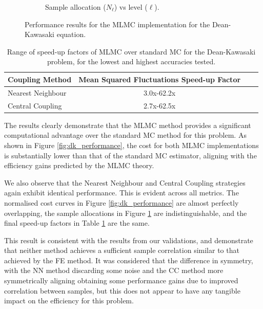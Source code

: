 \begin{figure}[htbp]
\begin{subfigure}{0.45\textwidth}
        \caption{Sample allocation ($N_\ell$) vs level ($\ell$).}
        \label{fig:dk_num}
    \end{subfigure}
    \caption{Performance results for the MLMC implementation for the Dean-Kawasaki equation.}
    \label{fig:performance_results_dk}
\end{figure}


\begin{table}[htbp]
    \centering
    \begin{tabular}{|l|c|c|r|}
        \hline
        \textbf{Coupling Method} & \textbf{Mean Squared Fluctuations Speed-up Factor}\\
        \hline
        Nearest Neighbour & 3.0x-62.2x \\
        Central Coupling & 2.7x-62.5x \\
        \hline
    \end{tabular}
    \caption{Range of speed-up factors of MLMC over standard MC for the Dean-Kawasaki problem, for the 
    lowest and highest accuracies tested.}
    \label{tab:dk_cost_scalings}
\end{table}


The results clearly demonstrate that the MLMC method provides a significant 
computational advantage over the standard MC method for this problem. 
As shown in Figure \ref{fig:dk_performance}, the cost for both MLMC
implementations is substantially lower
than that of the standard MC estimator, aligning with the efficiency 
gains predicted by the MLMC theory.

We also observe that the Nearest Neighbour and Central Coupling strategies again 
exhibit 
identical performance. This is evident across all metrics. The normalised 
cost curves in Figure \ref{fig:dk_performance} are almost perfectly overlapping, 
the sample allocations in Figure \ref{fig:dk_num} are indistinguishable, 
and the final speed-up factors in Table \ref{tab:dk_cost_scalings} 
are the same. 

This result is consistent with the results from our validations, and demonstrate that 
neither method achieves a sufficient sample correlation similar to that achieved by the 
FE method. It was considered that the difference in symmetry, with the NN 
method discarding some noise and the CC method more symmetrically aligning obtaining 
some performance gains due to improved correlation between samples, but this 
does not appear to have any tangible impact on the efficiency for this problem.
